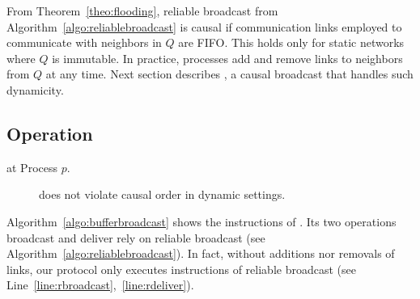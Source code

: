 From Theorem~\ref{theo:flooding}, reliable broadcast from
Algorithm~\ref{algo:reliablebroadcast} is causal if communication links employed
to communicate with neighbors in $Q$ are FIFO. This holds only for static
networks where $Q$ is immutable. In practice, processes add and remove links to
neighbors from $Q$ at any time. Next section describes \CBROADCAST, a causal
broadcast that handles such dynamicity.


\subsection{Operation}

\begin{algorithm}[h]
  
  \caption{\label{algo:bufferbroadcast}\CBROADCAST at Process $p$.}
\end{algorithm}

\begin{figure*}
  \begin{center}
    \hspace{20pt}
    \hspace{20pt}
    \hspace{20pt}
    \hspace{20pt}
    \caption{\label{fig:preventivesolve}\CBROADCAST does not violate causal
      order in dynamic settings.}
  \end{center}
\end{figure*}

Algorithm~\ref{algo:bufferbroadcast} shows the instructions of \CBROADCAST. Its
two operations broadcast and deliver rely on reliable broadcast (see
Algorithm~\ref{algo:reliablebroadcast}). In fact, without additions nor removals
of links, our protocol only executes instructions of reliable broadcast (see
Line~\ref{line:rbroadcast},~\ref{line:rdeliver}).


